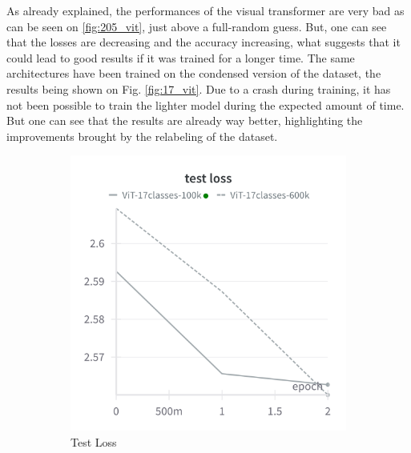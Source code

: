 \documentclass[twocolumn,superscriptaddress,aps]{revtex4-1}
\begin{document}
As already explained, the performances of the visual transformer are very bad as can be seen on \ref{fig:205_vit}, just above a full-random guess. But, one can see that the losses are decreasing and the accuracy increasing, what suggests that it could lead to good results if it was trained for a longer time. The same architectures have been trained on the condensed version of the dataset, the results being shown on Fig. \ref{fig:17_vit}. Due to a crash during training, it has not been possible to train the lighter model during the expected amount of time. But one can see that the results are already way better, highlighting the improvements brought by the relabeling of the dataset. 

\begin{figure}[H]
    \centering
    \begin{subfigure}{0.235 \textwidth}
        \includegraphics[width = 0.99 \textwidth]{images/17classes_vit_test.png}
        \caption{Test Loss}
    \end{subfigure}
    \begin{subfigure}{0.235 \textwidth}

\end{subfigure}
\end{figure}
\end{document}
